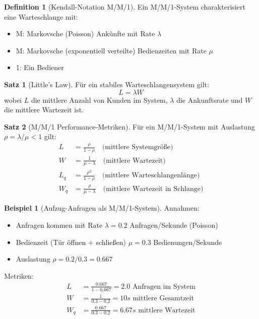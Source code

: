 ﻿\documentclass[a4paper,12pt]{report}
\theoremstyle{definition}
\newtheorem{definition}{Definition}[section]
\newtheorem{beispiel}{Beispiel}[section]
\newtheorem{satz}{Satz}[section]
\begin{document}
\begin{definition}[Kendall-Notation M/M/1]
	Ein M/M/1-System charakterisiert eine Warteschlange mit:
	\begin{itemize}
		\item[-] M: Markovsche (Poisson) Ankünfte mit Rate $\lambda$
		\item[-] M: Markovsche (exponentiell verteilte) Bedienzeiten mit Rate $\mu$
		\item[-] 1: Ein Bediener
	\end{itemize}
\end{definition}

\begin{satz}[Little's Law]
	Für ein stabiles Warteschlangensystem gilt:
	\[
	L = \lambda W
	\]
	wobei $L$ die mittlere Anzahl von Kunden im System, $\lambda$ die Ankunftsrate und $W$ die mittlere Wartezeit ist.
\end{satz}

\begin{satz}[M/M/1 Performance-Metriken]
	Für ein M/M/1-System mit Auslastung $\rho = \lambda/\mu < 1$ gilt:
	\begin{align}
		L &= \frac{\rho}{1-\rho} \quad \text{(mittlere Systemgröße)} \\
		W &= \frac{1}{\mu - \lambda} \quad \text{(mittlere Wartezeit)} \\
		L_q &= \frac{\rho^2}{1-\rho} \quad \text{(mittlere Warteschlangenlänge)} \\
		W_q &= \frac{\rho}{\mu - \lambda} \quad \text{(mittlere Wartezeit in Schlange)}
	\end{align}
\end{satz}

\begin{beispiel}[Aufzug-Anfragen als M/M/1-System]
	Annahmen:
	\begin{itemize}
		\item[-] Anfragen kommen mit Rate $\lambda = 0.2$ Anfragen/Sekunde (Poisson)
		\item[-] Bedienzeit (Tür öffnen + schließen) $\mu = 0.3$ Bedienungen/Sekunde
		\item[-] Auslastung $\rho = 0.2/0.3 = 0.667$
	\end{itemize}
	
	Metriken:
	\begin{align*}
		L &= \frac{0.667}{1-0.667} = 2.0 \text{ Anfragen im System} \\
		W &= \frac{1}{0.3 - 0.2} = 10s \text{ mittlere Gesamtzeit} \\
		W_q &= \frac{0.667}{0.3 - 0.2} = 6.67s \text{ mittlere Wartezeit}
	\end{align*}
\end{beispiel}
\end{document}
